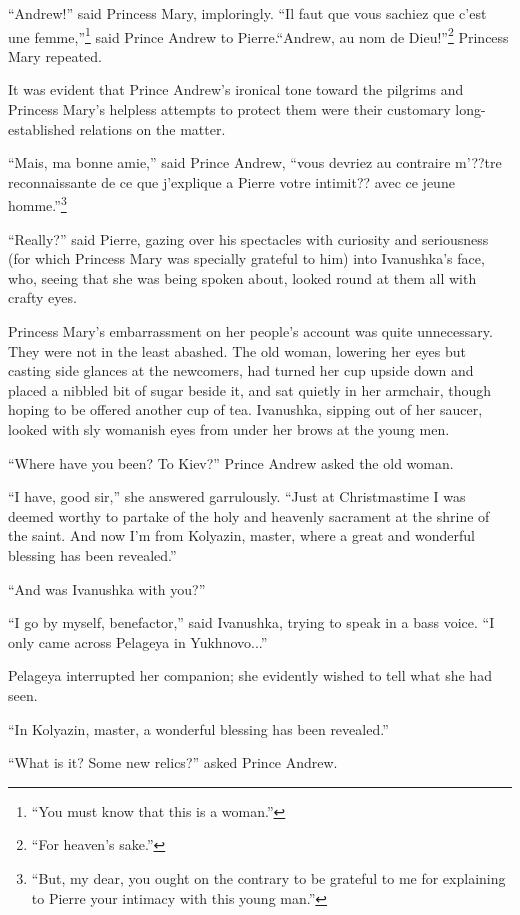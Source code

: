 ``Andrew!'' said Princess Mary, imploringly. ``Il faut que vous
sachiez que c'est une femme,''\footnote{``You must know that this
is a woman.''} said Prince Andrew to Pierre.``Andrew, au nom de
Dieu!''\footnote{``For heaven's sake.''} Princess Mary repeated.

It was evident that Prince Andrew's ironical tone toward the
pilgrims and Princess Mary's helpless attempts to protect them
were their customary long-established relations on the matter.

``Mais, ma bonne amie,'' said Prince Andrew, ``vous devriez au
contraire m'??tre reconnaissante de ce que j'explique a Pierre
votre intimit?? avec ce jeune homme.''\footnote{``But, my dear,
you ought on the contrary to be grateful to me for explaining to
Pierre your intimacy with this young man.''}

``Really?'' said Pierre, gazing over his spectacles with
curiosity and seriousness (for which Princess Mary was specially
grateful to him) into Ivanushka's face, who, seeing that she was
being spoken about, looked round at them all with crafty eyes.

Princess Mary's embarrassment on her people's account was quite
unnecessary. They were not in the least abashed. The old woman,
lowering her eyes but casting side glances at the newcomers, had
turned her cup upside down and placed a nibbled bit of sugar
beside it, and sat quietly in her armchair, though hoping to be
offered another cup of tea.  Ivanushka, sipping out of her
saucer, looked with sly womanish eyes from under her brows at the
young men.

``Where have you been? To Kiev?'' Prince Andrew asked the old
woman.

``I have, good sir,'' she answered garrulously. ``Just at
Christmastime I was deemed worthy to partake of the holy and
heavenly sacrament at the shrine of the saint. And now I'm from
Kolyazin, master, where a great and wonderful blessing has been
revealed.''

``And was Ivanushka with you?''

``I go by myself, benefactor,'' said Ivanushka, trying to speak
in a bass voice. ``I only came across Pelageya in Yukhnovo...''

Pelageya interrupted her companion; she evidently wished to tell
what she had seen.

``In Kolyazin, master, a wonderful blessing has been revealed.''

``What is it? Some new relics?'' asked Prince Andrew.

